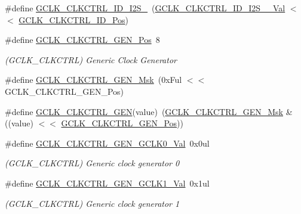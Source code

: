 \begin{DoxyCompactItemize}
\item 
\#define \mbox{\hyperlink{group___s_a_m_d21___g_c_l_k_ga2dcb44e7dcd4149f8672baf08dd8de8d}{G\+C\+L\+K\+\_\+\+C\+L\+K\+C\+T\+R\+L\+\_\+\+I\+D\+\_\+\+I2\+S\+\_}}~(\mbox{\hyperlink{group___s_a_m_d21___g_c_l_k_gab85ca6d48229a8290fe2c5d57e8c2396}{G\+C\+L\+K\+\_\+\+C\+L\+K\+C\+T\+R\+L\+\_\+\+I\+D\+\_\+\+I2\+S\+\_\+\_\+\+Val}}     $<$$<$ \mbox{\hyperlink{group___s_a_m_d21___g_c_l_k_ga882860b306b819b8bb342bebd55c23aa}{G\+C\+L\+K\+\_\+\+C\+L\+K\+C\+T\+R\+L\+\_\+\+I\+D\+\_\+\+Pos}})
\item 
\#define \mbox{\hyperlink{group___s_a_m_d21___g_c_l_k_gae80d1faef3b42edf73de73feef846841}{G\+C\+L\+K\+\_\+\+C\+L\+K\+C\+T\+R\+L\+\_\+\+G\+E\+N\+\_\+\+Pos}}~8
\begin{DoxyCompactList}\small\item\em (G\+C\+L\+K\+\_\+\+C\+L\+K\+C\+T\+RL) Generic Clock Generator \end{DoxyCompactList}\item 
\#define \mbox{\hyperlink{group___s_a_m_d21___g_c_l_k_ga5e33bef05f719c937bab8824ec26ed20}{G\+C\+L\+K\+\_\+\+C\+L\+K\+C\+T\+R\+L\+\_\+\+G\+E\+N\+\_\+\+Msk}}~(0x\+Ful $<$$<$ G\+C\+L\+K\+\_\+\+C\+L\+K\+C\+T\+R\+L\+\_\+\+G\+E\+N\+\_\+\+Pos)
\item 
\#define \mbox{\hyperlink{group___s_a_m_d21___g_c_l_k_ga78548c9373fc66d3d48155222c508728}{G\+C\+L\+K\+\_\+\+C\+L\+K\+C\+T\+R\+L\+\_\+\+G\+EN}}(value)~(\mbox{\hyperlink{group___s_a_m_d21___g_c_l_k_ga5e33bef05f719c937bab8824ec26ed20}{G\+C\+L\+K\+\_\+\+C\+L\+K\+C\+T\+R\+L\+\_\+\+G\+E\+N\+\_\+\+Msk}} \& ((value) $<$$<$ \mbox{\hyperlink{group___s_a_m_d21___g_c_l_k_gae80d1faef3b42edf73de73feef846841}{G\+C\+L\+K\+\_\+\+C\+L\+K\+C\+T\+R\+L\+\_\+\+G\+E\+N\+\_\+\+Pos}}))
\item 
\#define \mbox{\hyperlink{group___s_a_m_d21___g_c_l_k_gace6212456debec86346f66fdd9e345f0}{G\+C\+L\+K\+\_\+\+C\+L\+K\+C\+T\+R\+L\+\_\+\+G\+E\+N\+\_\+\+G\+C\+L\+K0\+\_\+\+Val}}~0x0ul
\begin{DoxyCompactList}\small\item\em (G\+C\+L\+K\+\_\+\+C\+L\+K\+C\+T\+RL) Generic clock generator 0 \end{DoxyCompactList}\item 
\#define \mbox{\hyperlink{group___s_a_m_d21___g_c_l_k_ga272c6846fcd4c313d7cc25dd48c4e46c}{G\+C\+L\+K\+\_\+\+C\+L\+K\+C\+T\+R\+L\+\_\+\+G\+E\+N\+\_\+\+G\+C\+L\+K1\+\_\+\+Val}}~0x1ul
\begin{DoxyCompactList}\small\item\em (G\+C\+L\+K\+\_\+\+C\+L\+K\+C\+T\+RL) Generic clock generator 1 \end{DoxyCompactList}\item 
$$
\end{DoxyCompactItemize}
